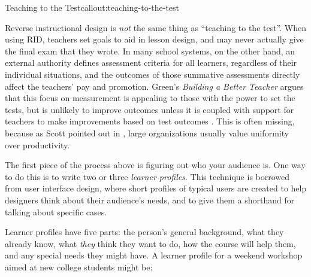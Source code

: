 \begin{callout}{Teaching to the Test}{callout:teaching-to-the-test}

Reverse instructional design is \emph{not} the same thing as
``teaching to the test''. When using RID, teachers set goals to aid in
lesson design, and may never actually give the final exam that they
wrote. In many school systems, on the other hand, an external
authority defines assessment criteria for all learners, regardless of
their individual situations, and the outcomes of those summative
assessments directly affect the teachers' pay and promotion.
Green's \emph{Building a Better Teacher} argues that this focus on
measurement is appealing to those with the power to set the tests, but
is unlikely to improve outcomes unless it is coupled with support for
teachers to make improvements based on test outcomes
\cite{bib:green-babt}.  This is often missing, because as Scott
pointed out in \cite{bib:scott-state}, large organizations usually
value uniformity over productivity.

\end{callout}


The first piece of the process above is figuring out who your audience
is.  One way to do this is to write two or three \emph{learner
profiles}. This technique is borrowed from user interface design,
where short profiles of typical users are created to help designers
think about their audience's needs, and to give them a shorthand for
talking about specific cases.

Learner profiles have five parts: the person's general background,
what they already know, what \emph{they} think they want to do, how
the course will help them, and any special needs they might have. A
learner profile for a weekend workshop aimed at new college students
might be:


